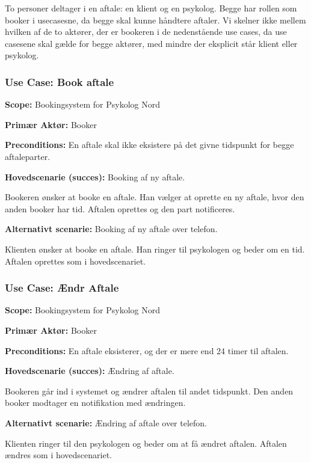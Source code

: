 To personer deltager i en aftale: en klient og en psykolog. Begge har rollen som booker i usecasesne, da begge skal kunne håndtere aftaler. 
Vi skelner ikke mellem hvilken af de to aktører, der er bookeren i de nedenstående use cases, da use casesene skal gælde for begge aktører, med mindre der eksplicit står klient eller psykolog.

\subsubsection{Use Case: Book aftale}\label{usecase:bookaftale}
{\setlength{\parindent}{0cm}
\textbf{Scope:} Bookingsystem for Psykolog Nord

\textbf{Primær Aktør:} Booker

\textbf{Preconditions:} En aftale skal ikke eksistere på det givne tidspunkt for begge aftaleparter.

\textbf{Hovedscenarie (succes):} Booking af ny aftale.

Bookeren ønsker at booke en aftale. 
Han vælger at oprette en ny aftale, hvor den anden booker har tid. 
Aftalen oprettes og den part notificeres.

\textbf{Alternativt scenarie:} Booking af ny aftale over telefon.

Klienten ønsker at booke en aftale. Han ringer til psykologen og beder om en tid. Aftalen oprettes som i hovedscenariet.
}

\subsubsection{Use Case: Ændr Aftale}
{\setlength{\parindent}{0cm}
\textbf{Scope:} Bookingsystem for Psykolog Nord

\textbf{Primær Aktør:} Booker 

\textbf{Preconditions:} En aftale eksisterer, og der er mere end 24 timer til aftalen.

\textbf{Hovedscenarie (succes):} Ændring af aftale.

Bookeren går ind i systemet og ændrer aftalen til andet tidspunkt.
Den anden booker modtager en notifikation med ændringen.

\textbf{Alternativt scenarie:} Ændring af aftale over telefon.

Klienten ringer til den psykologen og beder om at få ændret aftalen.
Aftalen ændres som i hovedscenariet.
}

